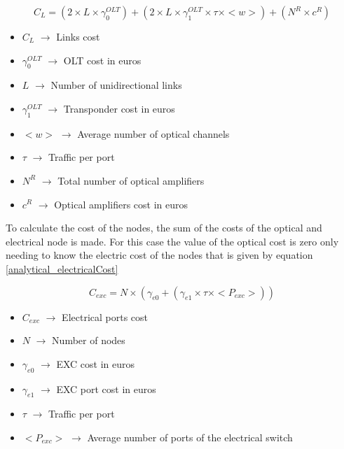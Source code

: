 \begin{equation}
C_L = \left(2 \times L \times \gamma_0^{OLT}\right) + \left(2 \times L \times \gamma_1^{OLT} \times \tau \times <w>\right) + \left(N^R \times c^R\right)
\label{analytical_linkCosts}
\end{equation}

\begin{itemize}
\item{$C_L$				$\rightarrow$	Links cost}
\item{$\gamma_0^{OLT}$	$\rightarrow$	OLT cost in euros}
\item{$L$				$\rightarrow$	Number of unidirectional links}
\item{$\gamma_1^{OLT}$	$\rightarrow$	Transponder cost in euros}
\item{$<w>$             $\rightarrow$   Average number of optical channels}
\item{$\tau$		    $\rightarrow$	Traffic per port}
\item{$N^R$				$\rightarrow$	Total number of optical amplifiers}
\item{$c^R$				$\rightarrow$	Optical amplifiers cost in euros}
\end{itemize}


To calculate the cost of the nodes, the sum of the costs of the optical and electrical node is made. For this case the value of the optical cost is zero only needing to know the electric cost of the nodes that is given by equation \ref{analytical_electricalCost}

\begin{equation}
C_{exc} = N \times \left( \gamma_{e0} + \left( \gamma_{e1} \times \tau \times <P_{exc}> \right) \right)
\label{analytical_electricalCost}
\end{equation}

\begin{itemize}
\item{$C_{exc}$		$\rightarrow$	Electrical ports cost}
\item{$N$			$\rightarrow$	Number of nodes}
\item{$\gamma_{e0}$	$\rightarrow$	EXC cost in euros}
\item{$\gamma_{e1}$	$\rightarrow$	EXC port cost in euros}
\item{$\tau$		$\rightarrow$	Traffic per port}
\item{$<P_{exc}>$   $\rightarrow$   Average number of ports of the electrical switch}
\end{itemize}


